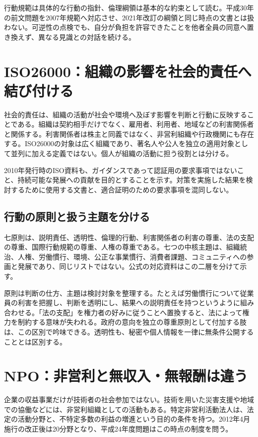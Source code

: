 行動規範は具体的な行動の指針、倫理綱領は基本的な約束として読む。平成30年の前文問題を2007年規範へ対応させ、2021年改訂の綱領と同じ時点の文書とは扱わない。可逆性の点検でも、自分が負担を許容できたことを他者全員の同意へ置き換えず、異なる見識との対話を続ける。

\section{ISO26000：組織の影響を社会的責任へ結び付ける}
\label{theory:ethics:iso}
社会的責任は、組織の活動が社会や環境へ及ぼす影響を判断と行動に反映することである。組織は契約相手だけでなく、雇用者、利用者、地域などの利害関係者と関係する。利害関係者は株主と同義ではなく、非営利組織や行政機関にも存在する。ISO26000の対象は広く組織であり、著名人や公人を独立の適用対象として並列に加える定義ではない。個人が組織の活動に担う役割とは分ける。

2010年発行時のISO資料も、ガイダンスであって認証用の要求事項ではないこと、持続可能な発展への貢献を目的とすることを示す\parencite{iso26000_project2010}。対策を実施した結果を検討するために使用する文書と、適合証明のための要求事項を混同しない。

\subsection{行動の原則と扱う主題を分ける}
七原則は、説明責任、透明性、倫理的行動、利害関係者の利害の尊重、法の支配の尊重、国際行動規範の尊重、人権の尊重である。七つの中核主題は、組織統治、人権、労働慣行、環境、公正な事業慣行、消費者課題、コミュニティへの参画と発展であり、同じリストではない。公式の対応資料はこの二層を分けて示す\parencite{iso_gri2014}。

原則は判断の仕方、主題は検討対象を整理する。たとえば労働慣行について従業員の利害を把握し、判断を透明にし、結果への説明責任を持つというように組み合わせる。「法の支配」を権力者の好みに従うことへ置換すると、法によって権力を制約する意味が失われる。政府の意向を独立の尊重原則として付加する肢は、この区別で吟味できる。透明性も、秘密や個人情報を一律に無条件公開することとは区別する。

\section{NPO：非営利と無収入・無報酬は違う}
\label{theory:ethics:npo}
企業の収益事業だけが技術者の社会参加ではない。技術を用いた災害支援や地域での協働などには、非営利組織としての活動もある。特定非営利活動法人は、法定の活動分野と、不特定多数の利益の増進という目的の条件を持つ。2012年4月施行の改正後は20分野となり、平成24年度問題はこの時点の制度を問う\parencite{cabinet_npo_overview}。

